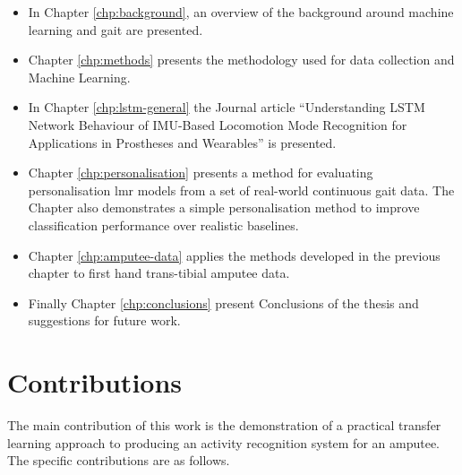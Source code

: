 \begin{itemize}
    \item In Chapter {\ref{chp:background}}, an overview of the background around machine learning and gait are presented.

    \item Chapter {\ref{chp:methods}} presents the methodology used for data collection and Machine Learning.

    \item In Chapter {\ref{chp:lstm-general}} the Journal article ``Understanding LSTM Network Behaviour of IMU-Based Locomotion Mode Recognition for Applications in Prostheses and Wearables'' is presented.

    \item Chapter {\ref{chp:personalisation}} presents a method for evaluating personalisation {\acrshort{lmr}} models from a set of real-world continuous gait data. The Chapter also demonstrates a simple personalisation method to improve classification performance over realistic baselines.

    \item Chapter {\ref{chp:amputee-data}} applies the methods developed in the previous chapter to first hand trans-tibial amputee data.

    \item Finally Chapter \ref{chp:conclusions} present Conclusions of the thesis and suggestions for future work.
\end{itemize}

\section{Contributions}
The main contribution of this work is the demonstration of a practical transfer learning approach to producing an activity recognition system for an amputee. The specific contributions are as follows.

